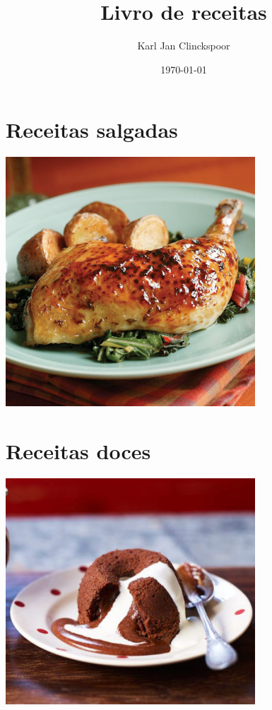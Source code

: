 \documentclass{book}
\title{Livro de receitas} \author{Karl Jan Clinckspoor} \date{\today}
\begin{document}
\maketitle
\tableofcontents

\chapter{Receitas salgadas}
\begin{center}
	\includegraphics[width=0.7\textwidth]{./Fotos/foto_savory}\end{center}
\clearpage


\chapter{Receitas doces}
\begin{center}
	\includegraphics[width=0.7\textwidth]{Fotos/foto_sweet} \end{center}
\clearpage


\end{document}
